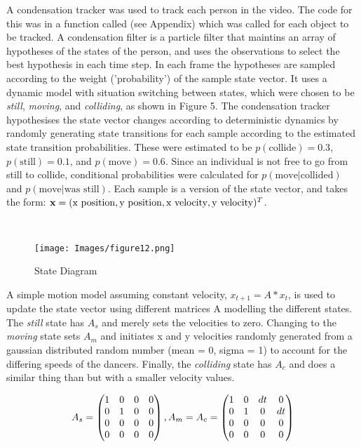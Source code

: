 \documentclass{article}
\begin{document}
A condensation tracker was used to track each person in the video. The code for this was in a function called  (see Appendix) which was called for each object to be tracked.  A condensation filter is a particle filter that maintins an array of hypotheses of the states of the person, and uses the observations to select the best hypothesis in each time step. In each frame the hypotheses are sampled according to the weight ('probability') of the sample state vector. It uses a dynamic model with situation switching between states, which were chosen to be \textit{still}, \textit{moving}, and \textit{colliding}, as shown in Figure 5. The condensation tracker hypothesises the state vector changes according to deterministic dynamics by randomly generating state transitions for each sample according to the estimated state transition probabilities. These were estimated to be $p(\textrm{collide}) = 0.3$, $p(\textrm{still}) = 0.1$, and $p(\textrm{move}) = 0.6$. Since an individual is not free to go from still to collide, conditional probabilities were calculated for $p(\textrm{move} | \textrm{collided}) $ and $p(\textrm{move} | \textrm{was still}) $. Each sample is a version of the state vector, and takes the form: $\bold{x} = (\textrm{x position}, \textrm{y position}, \textrm{x velocity}, \textrm{y velocity})^{T} $. 

\

\begin{figure}[h]
    \centering
    \texttt{[image: Images/figure12.png]} 
    \caption[b]{State Diagram}
\end{figure}



A simple motion model assuming constant velocity, $x_{t+1} = A * x_{t}$, is used to update the state vector using different matrices A modelling the different states. The \textit{still} state has $A_{s}$ and merely sets the velocities to zero. Changing to the \textit{moving} state sets $ A_{m} $ and initiates x and y velocities randomly generated from a gaussian distributed random number (mean = 0, sigma = 1) to account for the differing speeds of the dancers. Finally, the \textit{colliding} state has $A_{c}$ and does a similar thing than but with a smaller velocity values. 

\[ A_{s} = 
\left(\begin{array}{@{}cccc@{}}
    1 & 0 & 0 & 0 \\
    0 & 1 & 0 & 0 \\
    0 & 0 & 0 & 0 \\
    0 & 0 & 0 & 0 
\end{array}\right)
, A_{m} = A_{c} =
\left(\begin{array}{@{}cccc@{}}
    1 & 0 & dt & 0 \\
    0 & 1 & 0 & dt \\
    0 & 0 & 0 & 0 \\
    0 & 0 & 0 & 0 
\end{array}\right)
\]
\end{document}
